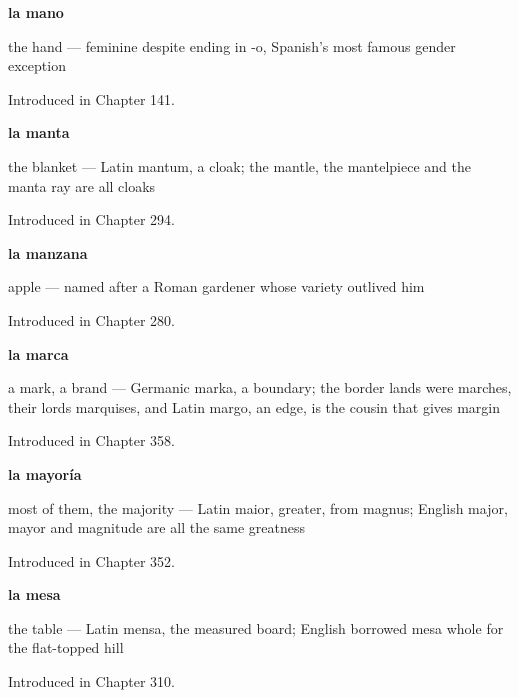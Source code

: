 \noindent\begin{minipage}[t]{\linewidth}
\raggedright
\textbf{la mano}\par
\small the hand — feminine despite ending in -o, Spanish's most famous gender exception\par
\footnotesize Introduced in Chapter 141.
\end{minipage}\par\medskip

\noindent\begin{minipage}[t]{\linewidth}
\raggedright
\textbf{la manta}\par
\small the blanket — Latin mantum, a cloak; the mantle, the mantelpiece and the manta ray are all cloaks\par
\footnotesize Introduced in Chapter 294.
\end{minipage}\par\medskip

\noindent\begin{minipage}[t]{\linewidth}
\raggedright
\textbf{la manzana}\par
\small apple — named after a Roman gardener whose variety outlived him\par
\footnotesize Introduced in Chapter 280.
\end{minipage}\par\medskip

\noindent\begin{minipage}[t]{\linewidth}
\raggedright
\textbf{la marca}\par
\small a mark, a brand — Germanic marka, a boundary; the border lands were marches, their lords marquises, and Latin margo, an edge, is the cousin that gives margin\par
\footnotesize Introduced in Chapter 358.
\end{minipage}\par\medskip

\noindent\begin{minipage}[t]{\linewidth}
\raggedright
\textbf{la mayoría}\par
\small most of them, the majority — Latin maior, greater, from magnus; English major, mayor and magnitude are all the same greatness\par
\footnotesize Introduced in Chapter 352.
\end{minipage}\par\medskip

\noindent\begin{minipage}[t]{\linewidth}
\raggedright
\textbf{la mesa}\par
\small the table — Latin mensa, the measured board; English borrowed mesa whole for the flat-topped hill\par
\footnotesize Introduced in Chapter 310.
\end{minipage}\par\medskip

